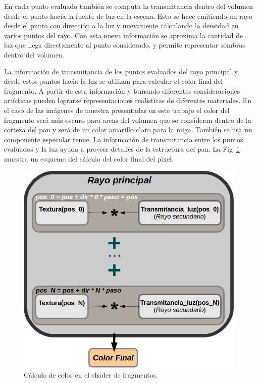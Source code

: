 \documentclass[spanish,a4paper,11pt,oneside,links]{report}
\begin{document}
En cada punto evaluado también se computa la transmitancia dentro del volumen desde el punto hacia la fuente de luz en la escena. Esto se hace emitiendo un rayo desde el punto con dirección a la luz y nuevamente calculando la densidad en varios puntos del rayo. Con esta nueva información se aproxima la cantidad de luz que llega directamente al punto considerado, y permite representar sombras dentro del volumen.

La información de transmitancia de los puntos evaluados del rayo principal y desde estos puntos hacia la luz se utilizan para calcular el color final del fragmento. A partir de esta información y tomando diferentes consideraciones artísticas pueden lograrse representaciones realísticas de diferentes materiales. En el caso de las imágenes de muestra presentadas en este trabajo el color del fragmento será más oscuro para areas del volumen que se consideran dentro de la corteza del pan y será de un color amarillo claro para la miga. También se usa un componente especular tenue. La información de transmitancia entre los puntos evaluados y la luz ayuda a proveer detalles de la estructura del pan. La Fig~\ref{fg:fragmentshader} muestra un esquema del cálculo del color final del pixel.

\begin{figure}[htb!]
  \centerline{\includegraphics[scale=0.5]{fragmentshader}}
  \caption{Cálculo de color en el shader de fragmentos. }
  \label{fg:fragmentshader}
\end{figure}
\end{document}
